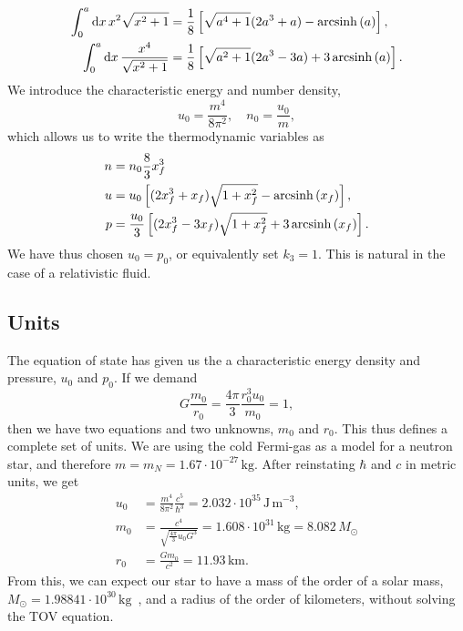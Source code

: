 %
\begin{align}
    \int_0^a \text{d} x \, x^2 \sqrt{x^2 + 1} 
    & = \frac{1}{8} 
    \left[\sqrt{a^4 + 1}(2 a^3 + a) - \operatorname{arcsinh}\left(a\right)\right], \\
    \int_0^a \text{d} x \, \frac{x^4}{\sqrt{x^2 + 1} }
    & = \frac{1}{8} 
    \left[\sqrt{a^2 + 1}(2 a^3 - 3a) + 3\operatorname{arcsinh}\left(a\right)\right].
\end{align}
%
We introduce the characteristic energy and number density,
% 
\begin{equation}
    u_0 = \frac{m^4}{8 \pi^2}, \quad n_0 = \frac{u_0}{m},
\end{equation}
%
which allows us to write the thermodynamic variables as
%
\begin{align}
    n &= n_0 \frac{8}{3} x_f^3 \\
    \label{Fermi gas energy density}
    u &= u_0
    \left[(2x_f^3 + x_f) \sqrt{1 + x_f^2} - \operatorname{arcsinh}\left(x_f\right)\right], \\
    \label{Fermi gas pressure}
    p &= \frac{u_0}{3}
    \left[(2x_f^3 - 3x_f) \sqrt{1 + x_f^2} + 3\operatorname{arcsinh}\left(x_f\right)\right].
\end{align}
%
We have thus chosen $u_0 = p_0$, or equivalently set $k_3 = 1$.
This is natural in the case of a relativistic fluid.

\subsection{Units}

The equation of state has given us the a characteristic energy density and pressure, $u_0$ and $p_0$. 
If we demand
%
\begin{equation}
    G \frac{m_0}{r_0} = \frac{4 \pi }{3}\frac{r_0^3 u_0}{m_0} = 1,
\end{equation}
%
then we have two equations and two unknowns, $m_0$ and $r_0$.
This thus defines a complete set of units.
We are using the cold Fermi-gas as a model for a neutron star, and therefore $m = m_N = 1.67 \cdot 10^{-27} \, \text{kg}$.
After reinstating $\hbar$ and $c$ in metric units, we get
%
\begin{align}
    u_0 &= \frac{m^4}{8 \pi^2}\frac{c^5}{\hbar^3} 
    = 2.032\cdot10^{35}  \, \text{J}\,\text{m}^{-3}, \\
    m_0 &= \frac{c^4}{\sqrt{\frac{4 \pi}{3} u_0 G^3} }
    = 1.608 \cdot 10^{31} \, \text{kg}
    = 8.082 \, M_\odot \\
    r_0 &= \frac{G m_0}{c^2} = 11.93 \, \text{km}. %
\end{align}
%
From this, we can expect our star to have a mass of the order of a solar mass, $M_\odot = 1.988 41\cdot 10^{30}\, \text{kg}$~\autocite{particledatagroupReviewParticlePhysics2020}, and a radius of the order of kilometers, without solving the TOV equation.


